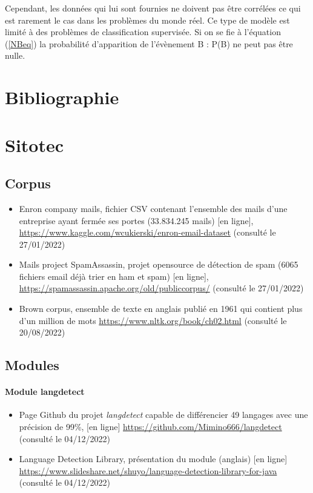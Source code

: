 \documentclass[a4paper,12pt]{article}
\begin{document}
				Cependant, les données qui lui sont fournies ne doivent pas être corrélées ce qui est rarement le cas dans les problèmes du monde réel. Ce type de modèle est limité à des problèmes de classification supervisée. Si on se fie à l'équation (\ref{NBeq}) la probabilité d'apparition de l’évènement B : P(B) ne peut pas être nulle. 
																
	\section{Bibliographie}
		
		


		
	\section{Sitotec}
		\subsection{Corpus}
			\begin{itemize}
				\item Enron company mails, fichier CSV contenant l'ensemble des mails d'une entreprise ayant fermée ses portes (33.834.245 mails) [en ligne], \url{https://www.kaggle.com/wcukierski/enron-email-dataset} (consulté le 27/01/2022) \label{Enron_dataset}
				\item Mails project SpamAssassin, projet opensource de détection de spam (6065 fichiers email déjà trier en ham et spam) [en ligne], \url{https://spamassassin.apache.org/old/publiccorpus/} (consulté le 27/01/2022) \label{SpamAssassin_dataset}
				\item Brown corpus, ensemble de texte en anglais publié en 1961 qui contient plus d'un million de mots \url{https://www.nltk.org/book/ch02.html} (consulté le 20/08/2022) \label{Brown_corpus}
			\end{itemize}
		
		\subsection{Modules}
			\paragraph{Module langdetect}
			\begin{itemize}
				\item Page Github du projet \emph{langdetect} capable de différencier 49 langages avec une précision de 99\%, [en ligne] \url{https://github.com/Mimino666/langdetect} (consulté le 04/12/2022) \label{langdetect}
				\item Language Detection Library, présentation du module (anglais) [en ligne] \url{https://www.slideshare.net/shuyo/language-detection-library-for-java} (consulté le 04/12/2022)
			\end{itemize}
			
\end{document}
